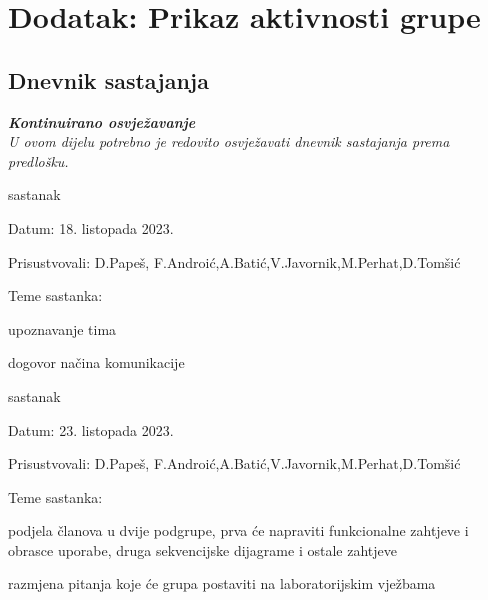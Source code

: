\chapter*{Dodatak: Prikaz aktivnosti grupe}
		
		\section*{Dnevnik sastajanja}
		
		\textbf{\textit{Kontinuirano osvježavanje}}\\
		
		 \textit{U ovom dijelu potrebno je redovito osvježavati dnevnik sastajanja prema predlošku.}
		
		\begin{packed_enum}
			\item  sastanak
			
			\item[] \begin{packed_item}
				\item Datum: 18. listopada 2023.
				\item Prisustvovali: D.Papeš, F.Androić,A.Batić,V.Javornik,M.Perhat,D.Tomšić
				\item Teme sastanka:
				\begin{packed_item}
					\item  upoznavanje tima
					\item  dogovor načina komunikacije
				\end{packed_item}
			\end{packed_item}
			
			\item  sastanak
			\item[] \begin{packed_item}
				\item Datum: 23. listopada 2023.
				\item Prisustvovali: D.Papeš, F.Androić,A.Batić,V.Javornik,M.Perhat,D.Tomšić
				\item Teme sastanka:
				\begin{packed_item}
					\item  podjela članova u dvije podgrupe, prva će napraviti funkcionalne zahtjeve i obrasce uporabe, druga sekvencijske dijagrame i ostale zahtjeve
					\item  razmjena pitanja koje će grupa postaviti na laboratorijskim vježbama
				\end{packed_item}
			\end{packed_item}
			

\end{packed_enum}
